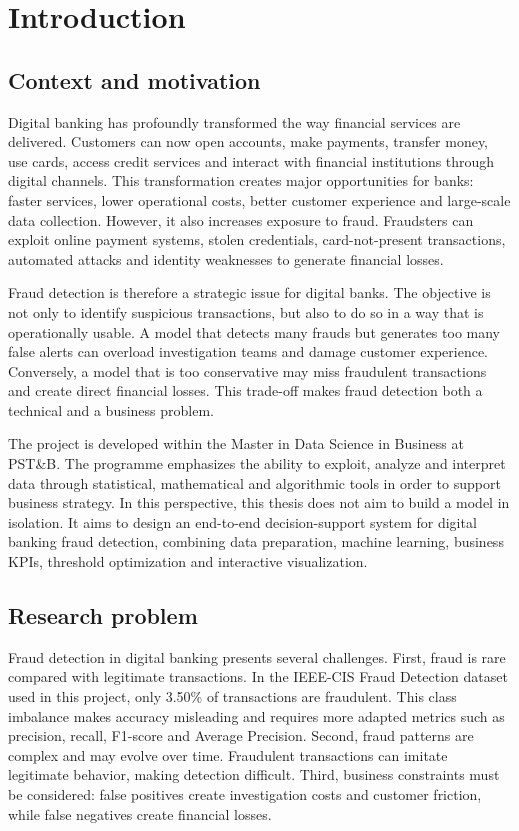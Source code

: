 ﻿\documentclass[12pt,a4paper,oneside]{report}
\begin{document}
\chapter{Introduction}

\section{Context and motivation}

Digital banking has profoundly transformed the way financial services are delivered. Customers can now open accounts, make payments, transfer money, use cards, access credit services and interact with financial institutions through digital channels. This transformation creates major opportunities for banks: faster services, lower operational costs, better customer experience and large-scale data collection. However, it also increases exposure to fraud. Fraudsters can exploit online payment systems, stolen credentials, card-not-present transactions, automated attacks and identity weaknesses to generate financial losses.

Fraud detection is therefore a strategic issue for digital banks. The objective is not only to identify suspicious transactions, but also to do so in a way that is operationally usable. A model that detects many frauds but generates too many false alerts can overload investigation teams and damage customer experience. Conversely, a model that is too conservative may miss fraudulent transactions and create direct financial losses. This trade-off makes fraud detection both a technical and a business problem.

The project is developed within the Master in Data Science in Business at PST\&B. The programme emphasizes the ability to exploit, analyze and interpret data through statistical, mathematical and algorithmic tools in order to support business strategy. In this perspective, this thesis does not aim to build a model in isolation. It aims to design an end-to-end decision-support system for digital banking fraud detection, combining data preparation, machine learning, business KPIs, threshold optimization and interactive visualization.

\section{Research problem}

Fraud detection in digital banking presents several challenges. First, fraud is rare compared with legitimate transactions. In the IEEE-CIS Fraud Detection dataset used in this project, only 3.50\% of transactions are fraudulent. This class imbalance makes accuracy misleading and requires more adapted metrics such as precision, recall, F1-score and Average Precision. Second, fraud patterns are complex and may evolve over time. Fraudulent transactions can imitate legitimate behavior, making detection difficult. Third, business constraints must be considered: false positives create investigation costs and customer friction, while false negatives create financial losses.
\end{document}
